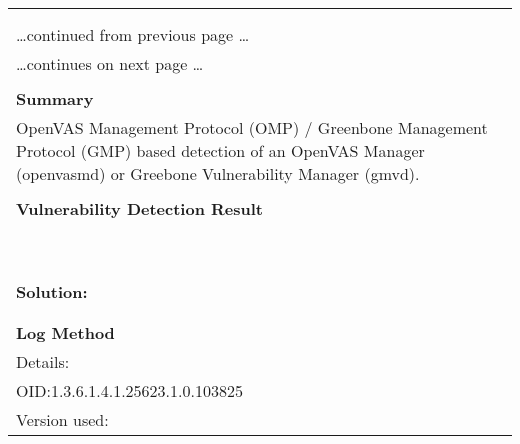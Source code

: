 \documentclass{article}
\begin{document}
\begin{longtable}{|p{}|}
\hline
\rowcolor{gvm_log}{\color{white}{Log (CVSS: 0.0) }}\\
\rowcolor{gvm_log}{\color{white}{NVT: OpenVAS / Greenbone Vulnerability Manager Detection (OMP/GMP)}}\\
\hline
\endfirsthead
\hfill\ldots continued from previous page \ldots \\
\hline
\endhead
\hline
\ldots continues on next page \ldots \\
\endfoot
\hline
\endlastfoot
\\
\textbf{Summary}\\
OpenVAS Management Protocol (OMP) / Greenbone Management
  Protocol (GMP) based detection of an OpenVAS Manager (openvasmd) or Greebone Vulnerability Manager
  (gmvd).\\

        \hline
        \\
\textbf{Vulnerability Detection Result}\\
\rowcolor{white}{\verb=Detected Greenbone Vulnerability Manager=}\\
\rowcolor{white}{\verb=Version:       21.4=}\\
\rowcolor{white}{\verb=Location:      9390/tcp=}\\
\rowcolor{white}{\verb=CPE:           cpe:/a:greenbone:greenbone_vulnerability_manager:21.4=}\\
\rowcolor{white}{\verb=Concluded from version/product identification result:=}\\
\rowcolor{white}{\verb= - GMP protocol version request:  <get_version/>=}\\
\rowcolor{white}{\verb= - GMP protocol version response: <get_version_response status=\verb-=-\verb="200" status_text=}\\
\rowcolor{white}{$\hookrightarrow$\verb==\verb-=-\verb="OK"><version>21.4</version>=}\\

          \hline
          \\
\textbf{Solution:}\\
\\


        \hline
        \\
\textbf{Log Method}\\
Details:
\rowcolor{white}{\verb=OpenVAS / Greenbone Vulnerability Manager Detection (OMP/GMP)=}\\
OID:1.3.6.1.4.1.25623.1.0.103825\\
Version used:
\rowcolor{white}{\verb=2021-05-10T09:35:39Z=}\\
\end{longtable}
\end{document}
